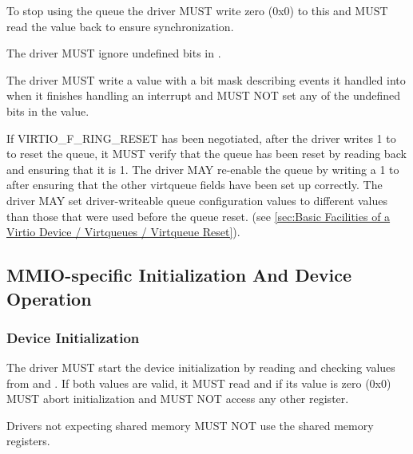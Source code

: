 To stop using the queue the driver MUST write zero (0x0) to this
 and MUST read the value back to ensure
synchronization.

The driver MUST ignore undefined bits in .

The driver MUST write a value with a bit mask describing events it handled into  when
it finishes handling an interrupt and MUST NOT set any of the undefined bits in the value.

If VIRTIO_F_RING_RESET has been negotiated, after the driver writes 1 to
 to reset the queue, it MUST verify that the queue
has been reset by reading back  and ensuring that it
is 1. The driver MAY re-enable the queue by writing a 1 to
 after ensuring that the other virtqueue fields have
been set up correctly. The driver MAY set driver-writeable queue configuration
values to different values than those that were used before the queue reset.
(see \ref{sec:Basic Facilities of a Virtio Device / Virtqueues / Virtqueue Reset}).

\subsection{MMIO-specific Initialization And Device Operation}\label{sec:Virtio Transport Options / Virtio Over MMIO / MMIO-specific Initialization And Device Operation}

\subsubsection{Device Initialization}\label{sec:Virtio Transport Options / Virtio Over MMIO / MMIO-specific Initialization And Device Operation / Device Initialization}


The driver MUST start the device initialization by reading and
checking values from  and .
If both values are valid, it MUST read 
and if its value is zero (0x0) MUST abort initialization and
MUST NOT access any other register.

Drivers not expecting shared memory MUST NOT use the shared
memory registers.

